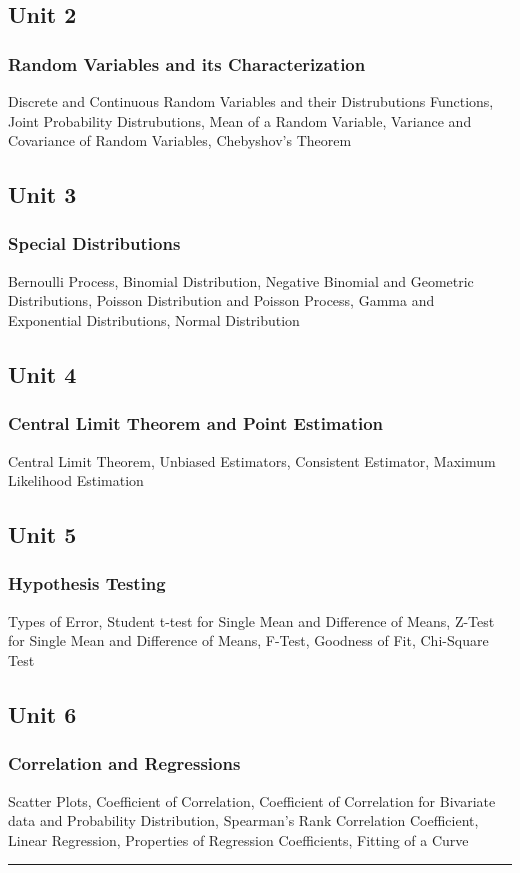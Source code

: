 \documentclass{article}
\begin{document}
\begin{multicols*}{2}
    \subsection*{Unit 2}
    \subsubsection*{Random Variables and its Characterization}
    Discrete and Continuous Random Variables and their Distrubutions Functions, Joint Probability Distrubutions, Mean of a Random Variable, Variance and Covariance of Random Variables, Chebyshov's Theorem
    \subsection*{Unit 3}
    \subsubsection*{Special Distributions}
    Bernoulli Process, Binomial Distribution, Negative Binomial and Geometric Distributions, Poisson Distribution and Poisson Process, Gamma and Exponential Distributions, Normal Distribution
    \subsection*{Unit 4}
    \subsubsection*{Central Limit Theorem and Point Estimation}
    Central Limit Theorem, Unbiased Estimators, Consistent Estimator, Maximum Likelihood Estimation
    \subsection*{Unit 5}
    \subsubsection*{Hypothesis Testing}
    Types of Error, Student t-test for Single Mean and Difference of Means, Z-Test for Single Mean and Difference of Means, F-Test, Goodness of Fit, Chi-Square Test
    \subsection*{Unit 6}
    \subsubsection*{Correlation and Regressions}
    Scatter Plots, Coefficient of Correlation, Coefficient of Correlation for Bivariate data and Probability Distribution, Spearman's Rank Correlation Coefficient, Linear Regression, Properties of Regression Coefficients, Fitting of a Curve  \\
    \hrule

\end{multicols*}
\end{document}
